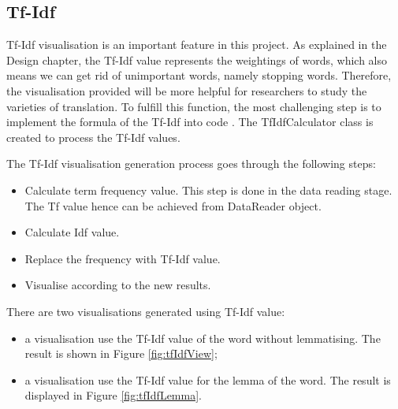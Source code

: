 \subsection{Tf-Idf}

Tf-Idf visualisation is an important feature in this project. As explained in the Design chapter, the Tf-Idf value represents the weightings of words, which also means we can get rid of unimportant words, namely stopping words. Therefore, the visualisation provided will be more helpful for researchers to study the varieties of translation. To fulfill this function, the most challenging step is to implement the formula of the Tf-Idf into code \cite{Manning2009}. The TfIdfCalculator class is created to process the Tf-Idf values.

The Tf-Idf visualisation generation process goes through the following steps:

\begin{itemize}
\item \textbf{} Calculate term frequency value. This step is done in the data reading stage. The Tf value hence can be achieved from DataReader object.
\item \textbf{} Calculate Idf value.  
\item \textbf{} Replace the frequency with Tf-Idf value.
\item \textbf{} Visualise according to the new results.
\end{itemize} 

There are two visualisations generated using Tf-Idf value: 

\begin{itemize}
	\item \textbf{} a visualisation use the Tf-Idf value of the word without lemmatising. The result is shown in Figure \ref{fig:tfIdfView};
	\item \textbf{} a visualisation use the Tf-Idf value for the lemma of the word. The result is displayed in Figure \ref{fig:tfIdfLemma}.
\end{itemize}

